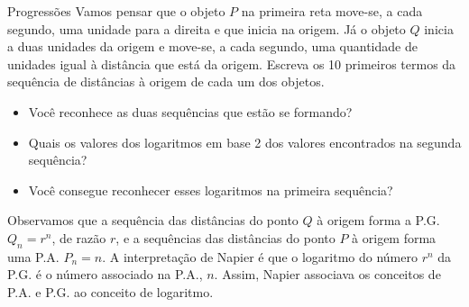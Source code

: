 \begin{task}{Progressões}
Vamos pensar que o objeto $P$ na primeira reta move-se, a cada segundo, uma unidade para a direita e que inicia na origem. Já o objeto $Q$ inicia a duas unidades da origem e move-se, a cada segundo, uma quantidade de unidades igual à distância que está da origem. Escreva os 10 primeiros termos da sequência de distâncias à origem de cada um dos objetos.
\begin{itemize}
\item Você reconhece as duas sequências que estão se formando? 
\item Quais os valores dos logaritmos em base 2 dos valores encontrados na segunda sequência?
\item Você consegue reconhecer esses logaritmos na primeira sequência?
\end{itemize}
\end{task}

Observamos que a sequência das distâncias do ponto $Q$ à origem forma a P.G. $Q_n=r^n$, de razão $r$, e a sequências das distâncias do ponto $P$ à origem forma uma P.A. $P_n =n$. A interpretação de Napier é que o logaritmo do número $r^n$ da P.G. é o número associado na P.A., $n$. Assim, Napier associava os conceitos de P.A. e P.G. ao conceito de logaritmo.
\clearpage

